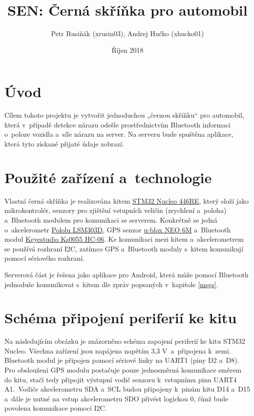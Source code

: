 \documentclass[a4paper,11pt,titlepage]{article}
\title{\textbf{SEN: Černá skříňka pro automobil}}
\author{Petr Rusiňák (xrusin03), Andrej Hučko (xhucko01)}
\date{Říjen 2018}
\begin{document}
\maketitle


\section{Úvod}

Cílem tohoto projektu je vytvořit jednoduchou „černou skříňku“ pro automobil, která
v~případě detekce nárazu odešle prostřednictvím Bluetooth informaci o~poloze vozidla
a~síle nárazu na server. Na serveru bude spuštěna aplikace, která tyto získané přijaté údaje
zobrazí.

\section{Použité zařízení a~technologie}

Vlastní černá skříňka je realizována kitem \href{https://www.st.com/en/evaluation-tools/nucleo-f446re.html}{STM32 Nucleo 446RE}, který složí jako mikrokontrolér,
senzory pro zjištění vstupních veličin (zrychlení a~poloha) a~Bluetooth modulem pro komunikaci se serverem.
Konkrétně se jedná o~akcelerometr
\href{https://www.pololu.com/product/2127}{Pololu LSM303D}, GPS senzor \href{https://www.u-blox.com/en/product/neo-6-series}{u-blox NEO 6M} a~Bluetooth modul \href{http://wiki.keyestudio.com/index.php/Ks0055_keyestudio_Bluetooth_Module}{Keyestudio Ks0055 HC-06}.
Ke komunikaci mezi kitem a~akcelerometrem se používá rozhraní I2C, zatímco GPS a~Bluetooth moduly
s~kitem komunikují pomocí sériového rozhraní.

Serverová část je řešena jako aplikace pro Android, která může pomocí Bluetooth jednoduše
komunikovat s~kitem dle zpráv popsaných v~kapitole \ref{msgs}.

\section{Schéma připojení periferií ke kitu}

Na následujícím obrázku je znázorněno schéma zapojení periferií ke kitu STM32 Nucleo.
Všechna zařízení jsou napájena napětím 3,3 V~a~připojena k~zemi. Bluetooth modul
je připojen pomocí sériové linky na UART1 (piny D2 a~D8). Pro obsloužení GPS modulu
postačuje pouze jednosměrná komunikace směrem do kitu, stačí tedy připojit
výstupní vodič senzoru k~vstupnímu pinu UART4 A1.~Vodiče akcelerometru SDA a~SCL
budou připojeny k~pinům kitu D14 a~D15 a~dále je nutné na vstup akcelerometru SDO přivést
logickou 0, čímž bude povolena komunikace pomocí I2C.
\end{document}
